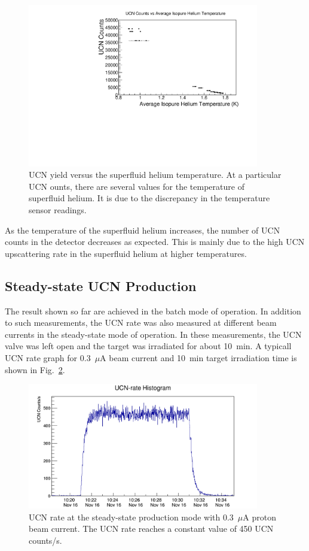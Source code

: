 \begin{figure}[h!]
  \centering
  \includegraphics[width=0.9\textwidth]{counts_vs_temp.pdf}
  \caption{UCN yield versus the superfluid helium temperature. At a
    particular UCN ounts, there are several values for the temperature
    of superfluid helium. It is due to the discrepancy in the
    temperature sensor readings.}
  \label{fig:counts_vs_temp}
\end{figure}

As the temperature of the superfluid helium increases, the
number of UCN counts in the detector decreases as expected. This is
mainly due to the high UCN upscattering rate in the superfluid helium
at higher temperatures.


\subsection{Steady-state UCN Production\label{sec:steadystate}}

The result shown so far are achieved in the batch mode of
operation. In addition to such measurements, the UCN rate was also
measured at different beam currents in the steady-state mode of
operation. In these measurements, the UCN valve was left open and the
target was irradiated for about 10~min. A typicall UCN rate graph for
0.3~$\mu$A beam current and 10~min target irradiation time is shown in
Fig.~\ref{fig:UCNRate_steadystate}.


\begin{figure}[h!]
  \centering
  \includegraphics[width=0.9\textwidth]{steadystate_point3muA.png}
  \caption{UCN rate at the steady-state production mode with 0.3~$\mu$A proton beam
    current. The UCN rate reaches a constant value of 450 UCN counts/s.}
  \label{fig:UCNRate_steadystate}
\end{figure}

